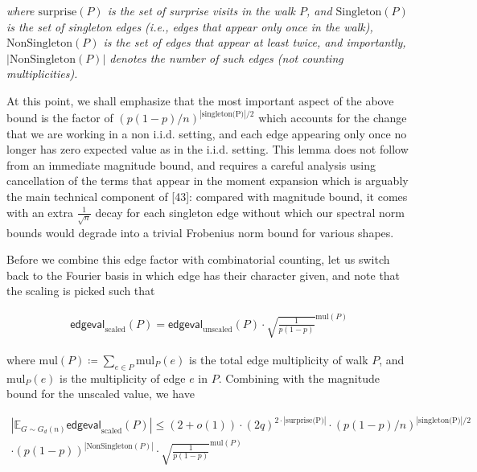 \emph{where $\text{surprise}(P)$ is the set of surprise visits in the walk $P$, and $\text{Singleton}(P)$ is the set of singleton edges (i.e., edges that appear only once in the walk), $\text{NonSingleton}(P)$ is the set of edges that appear at least twice, and importantly, $|\text{NonSingleton}(P)|$ denotes the number of such edges (not counting multiplicities).}\par






At this point, we shall emphasize that the most important aspect of the above bound is the factor of $(p(1-p)/n)^{|\text{singleton(P)}|/2}$ which accounts for the change that we are working in a non i.i.d. setting, and each edge appearing only once no longer has zero expected value as in the i.i.d. setting. This lemma does not follow from an immediate magnitude bound, and requires a careful analysis using cancellation of the terms that appear in the moment expansion which is arguably the main technical component of [43]: compared with magnitude bound, it comes with an extra $\frac{1}{\sqrt{n}}$ decay for each singleton edge without which our spectral norm bounds would degrade into a trivial Frobenius norm bound for various shapes.\par




Before we combine this edge factor with combinatorial counting, let us switch back to the Fourier basis in which edge has their character given, and note that the scaling is picked such that\par


\[\begin{gathered}
\mathsf{edgeval}_{\text{scaled}}(P)=\mathsf{edgeval}_{\text{unscaled}}(P)\cdot\sqrt{\frac{1}{p(1-p)}}^{\text{mul}(P)}
\end{gathered}\]


where $\text{mul}(P)\coloneqq\sum_{e\in P}\text{mul}_{P}(e)$ is the total edge multiplicity of walk $P$, and $\text{mul}_{P}(e)$ is the multiplicity of edge $e$ in $P$. Combining with the magnitude bound for the unscaled value, we have\par




\[\begin{gathered}
\displaystyle\left|\mathbb{E}_{G\sim G_{d}(n)}\mathsf{edgeval}_{\text{scaled}}(P)\right|\leq \displaystyle(2+o(1))\cdot(2q)^{2\cdot|\text{surprise(P)}|}\cdot(p(1-p)/n)^{|\text{singleton(P)}|/2} \\
\displaystyle\cdot(p(1-p))^{|\text{NonSingleton}(P)|}\cdot\sqrt{\frac{1}{p(1-p)}}^{\text{mul}(P)}
\end{gathered}\]




